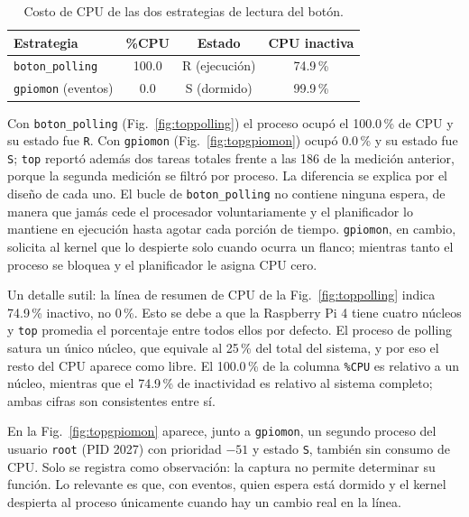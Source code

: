 \documentclass[conference]{IEEEtran}
\begin{document}
\begin{table}[t]
	\centering
	\caption{Costo de CPU de las dos estrategias de lectura del botón.}
	\label{tab:cpu}
	\begin{tabular}{|l|c|c|c|}
		\hline
		\textbf{Estrategia} & \textbf{\%CPU} & \textbf{Estado} & \textbf{CPU inactiva} \\
		\hline
		\texttt{boton\_polling} & 100.0 & R (ejecución) & 74.9\,\% \\
		\hline
		\texttt{gpiomon} (eventos) & 0.0 & S (dormido) & 99.9\,\% \\
		\hline
	\end{tabular}
\end{table}

Con \texttt{boton\_polling} (Fig.~\ref{fig:toppolling}) el proceso ocupó el 100.0\,\% de CPU y su estado fue \texttt{R}. Con \texttt{gpiomon} (Fig.~\ref{fig:topgpiomon}) ocupó 0.0\,\% y su estado fue \texttt{S}; \texttt{top} reportó además dos tareas totales frente a las 186 de la medición anterior, porque la segunda medición se filtró por proceso. La diferencia se explica por el diseño de cada uno. El bucle de \texttt{boton\_polling} no contiene ninguna espera, de manera que jamás cede el procesador voluntariamente y el planificador lo mantiene en ejecución hasta agotar cada porción de tiempo. \texttt{gpiomon}, en cambio, solicita al kernel que lo despierte solo cuando ocurra un flanco; mientras tanto el proceso se bloquea y el planificador le asigna CPU cero.

Un detalle sutil: la línea de resumen de CPU de la Fig.~\ref{fig:toppolling} indica 74.9\,\% inactivo, no 0\,\%. Esto se debe a que la Raspberry Pi 4 tiene cuatro núcleos y \texttt{top} promedia el porcentaje entre todos ellos por defecto. El proceso de polling satura un único núcleo, que equivale al 25\,\% del total del sistema, y por eso el resto del CPU aparece como libre. El 100.0\,\% de la columna \texttt{\%CPU} es relativo a un núcleo, mientras que el 74.9\,\% de inactividad es relativo al sistema completo; ambas cifras son consistentes entre sí.

En la Fig.~\ref{fig:topgpiomon} aparece, junto a \texttt{gpiomon}, un segundo proceso del usuario \texttt{root} (PID 2027) con prioridad $-51$ y estado \texttt{S}, también sin consumo de CPU. Solo se registra como observación: la captura no permite determinar su función. Lo relevante es que, con eventos, quien espera está dormido y el kernel despierta al proceso únicamente cuando hay un cambio real en la línea.
\end{document}
